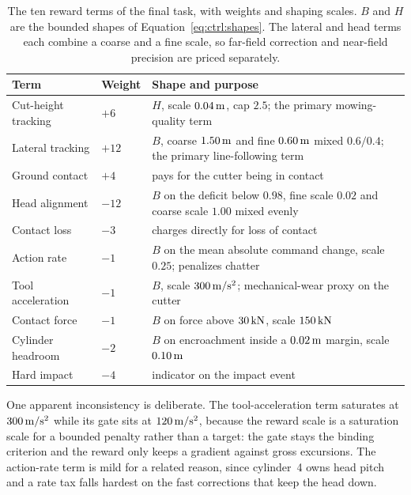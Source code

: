 \begin{table}[tb]
  \centering
  \caption{The ten reward terms of the final \ppoROM{} task, with weights and
  shaping scales. $B$ and $H$ are the bounded shapes of
  Equation~\eqref{eq:ctrl:shapes}. The lateral and head terms each combine a
  coarse and a fine scale, so far-field correction and near-field precision are
  priced separately.}
  \label{tab:ctrl:reward}
  \small
  \begin{tabular}{llp{6.0cm}}
    \toprule
    Term & Weight & Shape and purpose \\
    \midrule
    Cut-height tracking & $+6$   & $H$, scale $\unit[0.04]{m}$, cap $2.5$; the
      primary mowing-quality term \\
    Lateral tracking    & $+12$  & $B$, coarse $\unit[1.50]{m}$ and fine
      $\unit[0.60]{m}$ mixed $0.6/0.4$; the primary line-following term \\
    Ground contact      & $+4$   & pays for the cutter being in contact \\
    Head alignment      & $-12$  & $B$ on the deficit below $0.98$, fine scale
      $0.02$ and coarse scale $1.00$ mixed evenly \\
    Contact loss        & $-3$   & charges directly for loss of contact \\
    Action rate         & $-1$   & $B$ on the mean absolute command change,
      scale $0.25$; penalizes chatter \\
    Tool acceleration   & $-1$   & $B$, scale $\unit[300]{m/s^2}$;
      mechanical-wear proxy on the cutter \\
    Contact force       & $-1$   & $B$ on force above $\unit[30]{kN}$, scale
      $\unit[150]{kN}$ \\
    Cylinder headroom   & $-2$   & $B$ on encroachment inside a
      $\unit[0.02]{m}$ margin, scale $\unit[0.10]{m}$ \\
    Hard impact         & $-4$   & indicator on the impact event \\
    \bottomrule
  \end{tabular}
\end{table}

One apparent inconsistency is deliberate. The tool-acceleration term saturates
at $\unit[300]{m/s^2}$ while its gate sits at $\unit[120]{m/s^2}$, because the
reward scale is a saturation scale for a bounded penalty rather than a target:
the gate stays the binding criterion and the reward only keeps a gradient
against gross excursions. The action-rate term is mild for a related reason,
since cylinder~4 owns head pitch and a rate tax falls hardest on the fast
corrections that keep the head down.

